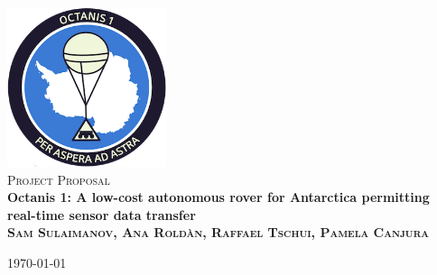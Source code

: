 \documentclass[a4paper,12pt]{article}
\begin{document}
\begin{titlepage}
\begin{center}

\includegraphics[width=0.35\textwidth]{patch}~\\[2cm]

\textsc{\Large Project Proposal}\\[0.5cm]

\huge \bfseries Octanis 1: A low-cost autonomous rover for Antarctica permitting real-time sensor data transfer \\[0.4cm] 

\textsc{\small Sam Sulaimanov, Ana Roldàn, Raffael Tschui, Pamela Canjura}
 

\vfill

{\large \today}

\end{center}
\end{titlepage}


\tableofcontents

\pagebreak
\end{document}
